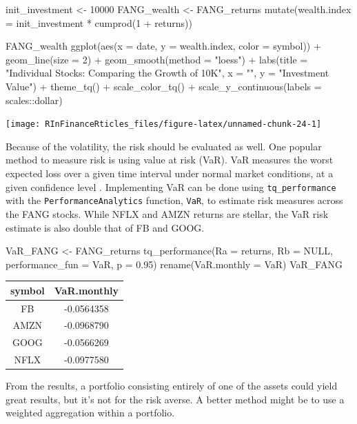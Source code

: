 \begin{Schunk}
\begin{Sinput}
init_investment <- 10000
FANG_wealth <- FANG_returns %
    mutate(wealth.index = init_investment * cumprod(1 + returns))

FANG_wealth %
    ggplot(aes(x = date, y = wealth.index, color = symbol)) +
    geom_line(size = 2) +
    geom_smooth(method = "loess") +
    labs(title = "Individual Stocks: Comparing the Growth of 10K",
         x = "", y = "Investment Value") +
    theme_tq() +
    scale_color_tq() +
    scale_y_continuous(labels = scales::dollar)
\end{Sinput}


\begin{center}\texttt{[image: RInFinanceRticles\_files/figure-latex/unnamed-chunk-24-1]} \end{center}

\end{Schunk}

Because of the volatility, the risk should be evaluated as well. One
popular method to measure risk is using value at risk (VaR). VaR
measures the worst expected loss over a given time interval under normal
market conditions, at a given confidence level \citep{Bacon2004}.
Implementing VaR can be done using \texttt{tq\_performance} with the
\texttt{PerformanceAnalytics} function, \texttt{VaR}, to estimate risk
measures across the FANG stocks. While NFLX and AMZN returns are
stellar, the VaR risk estimate is also double that of FB and GOOG.

\begin{Schunk}
\begin{Sinput}
VaR_FANG <- FANG_returns %
    tq_performance(Ra = returns, Rb = NULL, performance_fun = VaR, p = 0.95) %
    rename(VaR.monthly = VaR) 
VaR_FANG
\end{Sinput}
\end{Schunk}

\begin{tabular}{cc}
\toprule
symbol & VaR.monthly\\
\midrule
FB & -0.0564358\\
AMZN & -0.0968790\\
GOOG & -0.0566269\\
NFLX & -0.0977580\\
\bottomrule
\end{tabular}

\hspace{20 mm}

From the results, a portfolio consisting entirely of one of the assets
could yield great results, but it's not for the risk averse. A better
method might be to use a weighted aggregation within a portfolio.

